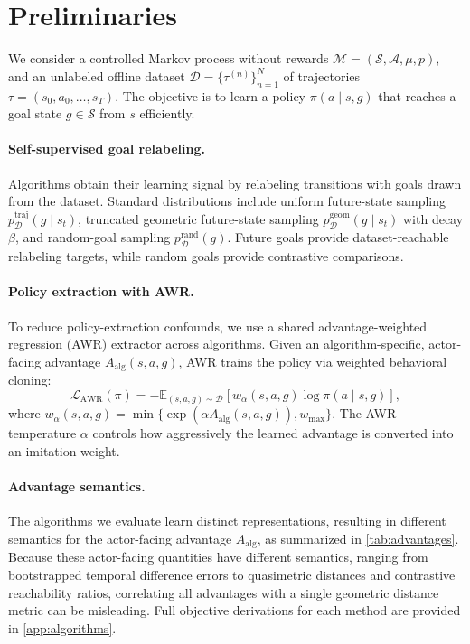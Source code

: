 \section{Preliminaries}
\label{sec:preliminaries}

We consider a controlled Markov process without rewards $\mathcal{M}=(\mathcal{S},\mathcal{A},\mu,p)$, and an unlabeled offline dataset $\mathcal{D} = \{\tau^{(n)}\}_{n=1}^{N}$ of trajectories $\tau = (s_0,a_0,\ldots,s_T)$. The objective is to learn a policy $\pi(a\mid s,g)$ that reaches a goal state $g \in \mathcal{S}$ from $s$ efficiently.

\paragraph{Self-supervised goal relabeling.}
Algorithms obtain their learning signal by relabeling transitions with goals drawn from the dataset. Standard distributions include uniform future-state sampling $p_{\mathcal{D}}^{\mathrm{traj}}(g\mid s_t)$, truncated geometric future-state sampling $p_{\mathcal{D}}^{\mathrm{geom}}(g\mid s_t)$ with decay $\beta$, and random-goal sampling $p_{\mathcal{D}}^{\mathrm{rand}}(g)$.
Future goals provide dataset-reachable relabeling targets, while random goals provide contrastive comparisons.

\paragraph{Policy extraction with AWR.}
To reduce policy-extraction confounds, we use a shared advantage-weighted regression (AWR) extractor across algorithms.
Given an algorithm-specific, actor-facing advantage $A_{\mathrm{alg}}(s,a,g)$, AWR trains the policy via weighted behavioral cloning:
\begin{equation}
    \mathcal{L}_{\mathrm{AWR}}(\pi) = -\mathbb{E}_{(s,a,g)\sim\mathcal{D}} \left[ w_\alpha(s,a,g)\log\pi(a\mid s,g) \right],
\end{equation}
where $w_\alpha(s,a,g) = \min\{\exp(\alpha A_{\mathrm{alg}}(s,a,g)), w_{\max}\}$. The AWR temperature $\alpha$ controls how aggressively the learned advantage is converted into an imitation weight.

\paragraph{Advantage semantics.}
The algorithms we evaluate learn distinct representations, resulting in different semantics for the actor-facing advantage $A_{\mathrm{alg}}$, as summarized in \cref{tab:advantages}.
Because these actor-facing quantities have different semantics, ranging from bootstrapped temporal difference errors to quasimetric distances and contrastive reachability ratios, correlating all advantages with a single geometric distance metric can be misleading.
Full objective derivations for each method are provided in \cref{app:algorithms}.

